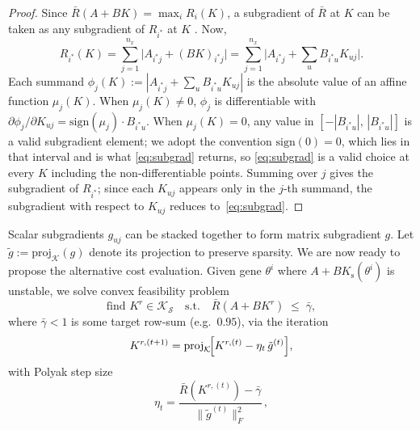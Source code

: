 \documentclass[letterpaper, 10pt, conference]{ieeeconf}
\begin{document}
\begin{proof}
Since $\bar{R}(A+BK)=\max_i R_i(K)$, a subgradient of $\bar{R}$ at $K$
can be taken as any subgradient of $R_{i^*}$ at $K$
\cite[Sec.~3.1.2]{shin}.  Now,
\[
  R_{i^*}(K) = \sum_{j=1}^{n_x} \bigl|A_{i^*j} + (BK)_{i^*j}\bigr|
  = \sum_{j=1}^{n_x} \bigl|A_{i^*j} + \textstyle\sum_u B_{i^*u}K_{uj}\bigr|.
\]
Each summand $\phi_j(K) :=|A_{i^*j}+\sum_u B_{i^*u}K_{uj}|$ is
the absolute value of an affine function $\mu_j(K)$.  When
$\mu_j(K)\neq 0$, $\phi_j$ is differentiable with
$\partial\phi_j/\partial K_{uj}=\mathrm{sign}(\mu_j)\cdot B_{i^*u}$.
When $\mu_j(K)=0$, any value in
$[-|B_{i^*u}|,\,|B_{i^*u}|]$ is a valid subgradient element; we adopt the
convention $\mathrm{sign}(0)=0$, which lies in that interval and is what
\eqref{eq:subgrad} returns, so \eqref{eq:subgrad} is a valid choice at every $K$
including the non-differentiable points.
Summing over $j$ gives the subgradient of $R_{i^*}$; since each $K_{uj}$ appears only in the $j$-th summand, the subgradient with respect to $K_{uj}$ reduces to~\eqref{eq:subgrad}.
\end{proof}

Scalar subgradients $g_{uj}$ can be stacked together to form matrix subgradient $g$. Let $\tilde{g} := \mathrm{proj}_{\mathcal{K}}(g)$ denote its projection to preserve sparsity. We are now ready to propose the alternative cost evaluation. Given gene $\theta^i$ where $A+BK_{\mathrm{s}}(\theta^i)$ is unstable, we solve convex feasibility problem
\begin{equation}\label{eq:feasibility}
  \text{find } K^r \in\mathcal{K}_{\mathcal{S}} \quad
  \text{s.t.}\quad \bar{R}(A+BK^r) \;\le\; \bar{\gamma},
\end{equation}
where $\bar{\gamma}<1$ is some target row-sum (e.g.\ $0.95$), via the iteration
\begin{equation}\label{eq:subgrad_update}
  K^{r,(t+1)} = \mathrm{proj}_{\mathcal{K}}\!\Bigl[
    K^{r,(t)} - \eta_t\,\tilde{g}^{(t)}
  \Bigr],
\end{equation}
with Polyak step size
\begin{equation}\label{eq:polyak}
  \eta_t = \frac{\bar{R}(K^{r,(t)})-\bar{\gamma}}
               {\|\tilde{g}^{(t)}\|_F^2}\,,
\end{equation}
\end{document}
